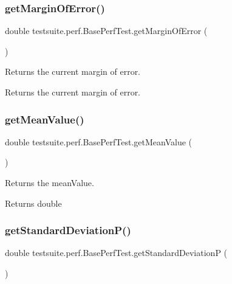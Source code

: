 \subsubsection{\texorpdfstring{get\+Margin\+Of\+Error()}{getMarginOfError()}}
{\footnotesize\ttfamily double testsuite.\+perf.\+Base\+Perf\+Test.\+get\+Margin\+Of\+Error (\begin{DoxyParamCaption}{ }\end{DoxyParamCaption})\hspace{0.3cm}{\ttfamily [protected]}}

Returns the current margin of error.

\begin{DoxyReturn}{Returns}
the current margin of error. 
\end{DoxyReturn}
\mbox{\label{classtestsuite_1_1perf_1_1_base_perf_test_a27382fb187f93da07deaa8b4ce1cc3e9}} 
\subsubsection{\texorpdfstring{get\+Mean\+Value()}{getMeanValue()}}
{\footnotesize\ttfamily double testsuite.\+perf.\+Base\+Perf\+Test.\+get\+Mean\+Value (\begin{DoxyParamCaption}{ }\end{DoxyParamCaption})}

Returns the mean\+Value.

\begin{DoxyReturn}{Returns}
double 
\end{DoxyReturn}
\mbox{\label{classtestsuite_1_1perf_1_1_base_perf_test_a72145770043104a1fe0a8a1648044aed}} 
\subsubsection{\texorpdfstring{get\+Standard\+Deviation\+P()}{getStandardDeviationP()}}
{\footnotesize\ttfamily double testsuite.\+perf.\+Base\+Perf\+Test.\+get\+Standard\+DeviationP (\begin{DoxyParamCaption}{ }\end{DoxyParamCaption})\hspace{0.3cm}{\ttfamily [protected]}}


